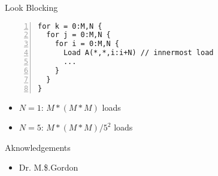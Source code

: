 \documentclass{beamer}
\begin{document}
\scriptsize

\begin{frame}[fragile]{Look Blocking}
\begin{lstlisting}[numbers=left]
for k = 0:M,N {
  for j = 0:M,N {
    for i = 0:M,N {
      Load A(*,*,i:i+N) // innermost load
      ...
    }
  }
}
\end{lstlisting}
\begin{itemize}
  \item $N = 1$: $M*(M*M)$ loads
  \item $N = 5$: $M*(M*M)/5^2$ loads
\end{itemize}
\end{frame}

\normalsize
 
\begin{frame}{Aknowledgements}
  \begin{itemize}
  \item Dr. M.\$.Gordon
  \end{itemize}
\end{frame}
\end{document}
